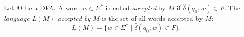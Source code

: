 

\setcounter{section}{1}
\setcounter{subsection}{2}
\setcounter{dfn}{2}

\begin{dfn}
Let $M$ be a DFA.
A word $w \in \Sigma^*$ is called \emph{accepted} by $M$ if $\widehat{\delta}(q_0, w) \in F$.
The \emph{language $L(M)$ accepted by} $M$ is the set of all words accepted by $M$:
\[
L(M) = \{w \in \Sigma^* \mid \widehat{\delta}(q_0,w) \in F\}.
\]
\end{dfn}


